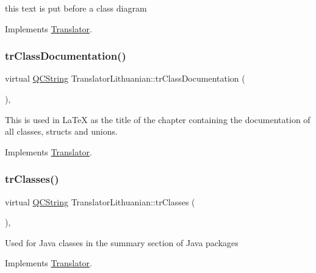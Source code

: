 this text is put before a class diagram 

Implements \mbox{\hyperlink{class_translator}{Translator}}.

\mbox{\label{class_translator_lithuanian_a627deebbc4ea8c90fa5c1de142760d6f}} 
\subsubsection{\texorpdfstring{trClassDocumentation()}{trClassDocumentation()}}
{\footnotesize\ttfamily virtual \mbox{\hyperlink{class_q_c_string}{Q\+C\+String}} Translator\+Lithuanian\+::tr\+Class\+Documentation (\begin{DoxyParamCaption}{ }\end{DoxyParamCaption})\hspace{0.3cm}{\ttfamily [inline]}, {\ttfamily [virtual]}}

This is used in La\+TeX as the title of the chapter containing the documentation of all classes, structs and unions. 

Implements \mbox{\hyperlink{class_translator}{Translator}}.

\mbox{\label{class_translator_lithuanian_aa15512a226d697764fabe48c699742b1}} 
\subsubsection{\texorpdfstring{trClasses()}{trClasses()}}
{\footnotesize\ttfamily virtual \mbox{\hyperlink{class_q_c_string}{Q\+C\+String}} Translator\+Lithuanian\+::tr\+Classes (\begin{DoxyParamCaption}{ }\end{DoxyParamCaption})\hspace{0.3cm}{\ttfamily [inline]}, {\ttfamily [virtual]}}

Used for Java classes in the summary section of Java packages 

Implements \mbox{\hyperlink{class_translator}{Translator}}.

\mbox{\label{class_translator_lithuanian_a310ef9363b1d7c486deedec275106150}} 
